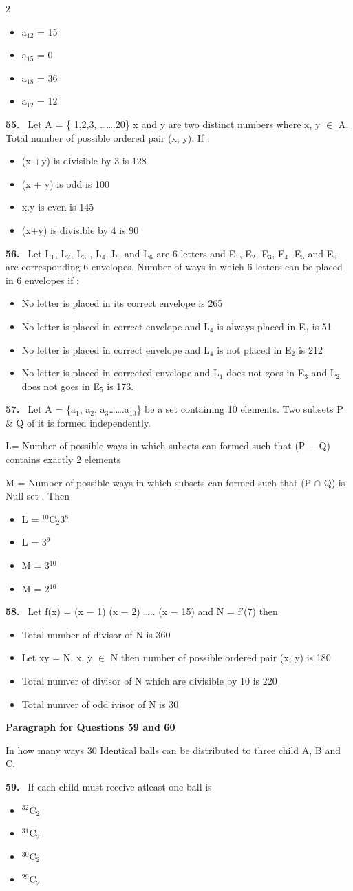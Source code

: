 \documentclass[10pt]{extarticle}
\newcommand{\qn}[1]{\par\smallskip\noindent\textbf{#1.}~}
\newcommand{\paraq}[2]{\par\smallskip\noindent\textbf{Paragraph for Questions #1 and #2}\par}
\newenvironment{qoptions}{\begin{itemize}[leftmargin=1.8em,itemsep=1pt,topsep=2pt,label={}]}{\end{itemize}}
\newcommand{\opt}[2]{\item[(#1)] #2}
\begin{document}
\begin{multicols}{2}
\begin{qoptions}
\opt{A}{a$_{12}$ = 15}
\opt{B}{a$_{15}$ = 0}
\opt{C}{a$_{18}$ = 36}
\opt{D}{a$_{12}$ = 12}
\end{qoptions}
\qn{55} Let A = \{ 1,2,3, \dots\dots.20\} x and y are two distinct numbers where x, y $\in$ A. Total number of possible ordered pair (x, y). If :
\begin{qoptions}
\opt{A}{(x +y) is divisible by 3 is 128}
\opt{B}{(x + y) is odd is 100}
\opt{C}{x.y is even is 145}
\opt{D}{(x+y) is divisible by 4 is 90}
\end{qoptions}
\qn{56} Let L$_1$, L$_2$, L$_3$ , L$_4$, L$_5$ and L$_6$ are 6 letters and E$_1$, E$_2$, E$_3$, E$_4$, E$_5$ and E$_6$ are corresponding 6 envelopes. Number of ways in which 6 letters can be placed in 6 envelopes if :
\begin{qoptions}
\opt{A}{No letter is placed in its correct envelope is 265}
\opt{B}{No letter is placed in correct envelope and L$_4$ is always placed in E$_3$ is 51}
\opt{C}{No letter is placed in correct envelope and L$_4$ is not placed in E$_2$ is 212}
\opt{D}{No letter is placed in corrected envelope and L$_1$ does not goes in E$_3$ and L$_2$ does not goes in E$_5$ is 173.}
\end{qoptions}
\qn{57} Let A = \{a$_1$, a$_2$, a$_3$\dots\dots.a$_{10}$\} be a set containing 10 elements. Two subsets P \& Q of it is formed independently.\par
L= Number of possible ways in which subsets can formed such that (P $-$ Q) contains exactly 2 elements\par
M = Number of possible ways in which subsets can formed such that (P $\cap$ Q) is Null set . Then
\begin{qoptions}
\opt{A}{L = $^{10}$C$_2$3$^8$}
\opt{B}{L = 3$^9$}
\opt{C}{M = 3$^{10}$}
\opt{D}{M = 2$^{10}$}
\end{qoptions}
\qn{58} Let f(x) = (x $-$ 1) (x $-$ 2) \dots.. (x $-$ 15) and N = f$'$(7) then
\begin{qoptions}
\opt{A}{Total number of divisor of N is 360}
\opt{B}{Let xy = N, x, y $\in$ N then number of possible ordered pair (x, y) is 180}
\opt{C}{Total numver of divisor of N which are divisible by 10 is 220}
\opt{D}{Total numver of odd ivisor of N is 30}
\end{qoptions}
\paraq{59}{60}In how many ways 30 Identical balls can be distributed to three child A, B and C.
\qn{59} If each child must receive atleast one ball is
\begin{qoptions}
\opt{A}{$^{32}$C$_2$}
\opt{B}{$^{31}$C$_2$}
\opt{C}{$^{30}$C$_2$}
\opt{D}{$^{29}$C$_2$}

\end{qoptions}
\end{multicols}
\end{document}
